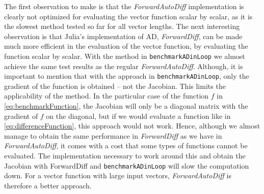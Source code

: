 The first observation to make is that the \textit{ForwardAutoDiff} implementation is clearly not optimized for evaluating the vector function scalar by scalar, as it is the slowest method tested so far for all vector lengths. The next interesting observation is that Julia's implementation of AD, \textit{ForwardDiff}, can be made much more efficient in the evaluation of the vector function, by evaluating the function scalar by scalar. With the method in \texttt{benchmarkADinLoop} we almost achieve the same test results as the regular \textit{ForwardAutoDiff}. Although, it is important to mention that with the approach in \texttt{benchmarkADinLoop}, only the gradient of the function is obtained -- not the Jacobian. This limits the applicability of the method. In the particular case of the function $f$ in \eqref{eq:benchmarkFunction}, the Jacobian will only be a diagonal matrix with the gradient of $f$ on the diagonal, but if we would evaluate a function like in \eqref{eq:differenceFunction}, this approach would not work. Hence, although we almost manage to obtain the same performance in \textit{ForwardDiff} as we have in \textit{ForwardAutoDiff}, it comes with a cost that some types of functions cannot be evaluated. The implementation necessary to work around this and obtain the Jacobian with ForwardDiff and \texttt{benchmarkADinLoop} will slow the computation down. For a vector function with large input vectors, \textit{ForwardAutoDiff} is therefore a better approach. 

